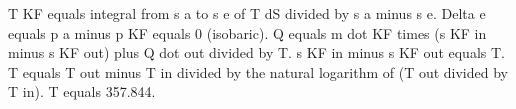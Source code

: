 T KF equals integral from s a to s e of T dS divided by s a minus s e.  
Delta e equals p a minus p KF equals 0 (isobaric).  
Q equals m dot KF times (s KF in minus s KF out) plus Q dot out divided by T.  
s KF in minus s KF out equals T.  
T equals T out minus T in divided by the natural logarithm of (T out divided by T in).  
T equals 357.844.